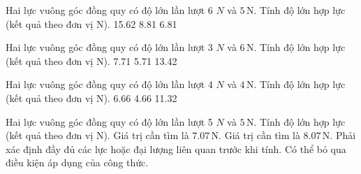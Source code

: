 \begin{ex}
Hai lực vuông góc đồng quy có độ lớn lần lượt 6 $N$ và $5\,\text{N}$. Tính độ lớn hợp lực (kết quả theo đơn vị N).
\choice
{15.62}
{8.81}
{6.81}
{}
\end{ex}

\begin{ex}
Hai lực vuông góc đồng quy có độ lớn lần lượt 3 $N$ và $6\,\text{N}$. Tính độ lớn hợp lực (kết quả theo đơn vị N).
\choice
{}
{7.71}
{5.71}
{13.42}
\end{ex}

\begin{ex}
Hai lực vuông góc đồng quy có độ lớn lần lượt 4 $N$ và $4\,\text{N}$. Tính độ lớn hợp lực (kết quả theo đơn vị N).
\choice
{6.66}
{}
{4.66}
{11.32}
\end{ex}

\begin{ex}
Hai lực vuông góc đồng quy có độ lớn lần lượt 5 $N$ và $5\,\text{N}$. Tính độ lớn hợp lực (kết quả theo đơn vị N).
\choiceTF
{\True Giá trị cần tìm là $7.07\,\text{N}$.}
{Giá trị cần tìm là $8.07\,\text{N}$.}
{\True Phải xác định đầy đủ các lực hoặc đại lượng liên quan trước khi tính.}
{Có thể bỏ qua điều kiện áp dụng của công thức.}
\end{ex}

